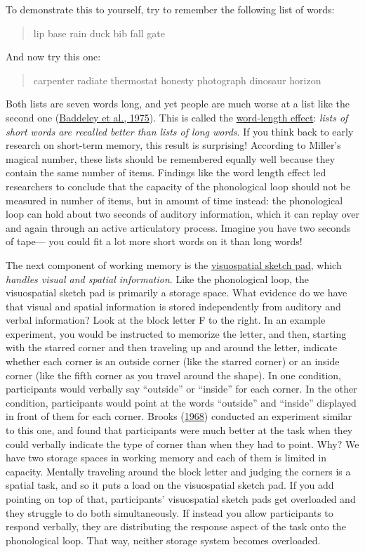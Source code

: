 \documentclass[
]{krantz}
\begin{document}
To demonstrate this to yourself, try to remember the following list of words:

\begin{quote}
lip base rain duck bib fall gate
\end{quote}

And now try this one:

\begin{quote}
carpenter radiate thermostat honesty photograph dinosaur horizon
\end{quote}

Both lists are seven words long, and yet people are much worse at a list like the second one (\protect\hyperlink{ref-baddeley1975word}{Baddeley et al., 1975}). This is called the \protect\hyperlink{word-length-effect}{word-length effect}: \emph{lists of short words are recalled better than lists of long words}. If you think back to early research on short-term memory, this result is surprising! According to Miller's magical number, these lists should be remembered equally well because they contain the same number of items. Findings like the word length effect led researchers to conclude that the capacity of the phonological loop should not be measured in number of items, but in amount of time instead: the phonological loop can hold about two seconds of auditory information, which it can replay over and again through an active articulatory process. Imagine you have two seconds of tape--- you could fit a lot more short words on it than long words!

The next component of working memory is the \protect\hyperlink{visuospatial-sketch-pad}{visuospatial sketch pad}, which \emph{handles visual and spatial information}. Like the phonological loop, the visuospatial sketch pad is primarily a storage space. What evidence do we have that visual and spatial information is stored independently from auditory and verbal information? Look at the block letter F to the right. In an example experiment, you would be instructed to memorize the letter, and then, starting with the starred corner and then traveling up and around the letter, indicate whether each corner is an outside corner (like the starred corner) or an inside corner (like the fifth corner as you travel around the shape). In one condition, participants would verbally say ``outside'' or ``inside'' for each corner. In the other condition, participants would point at the words ``outside'' and ``inside'' displayed in front of them for each corner. Brooks (\protect\hyperlink{ref-Brooks1968}{1968}) conducted an experiment similar to this one, and found that participants were much better at the task when they could verbally indicate the type of corner than when they had to point. Why? We have two storage spaces in working memory and each of them is limited in capacity. Mentally traveling around the block letter and judging the corners is a spatial task, and so it puts a load on the visuospatial sketch pad. If you add pointing on top of that, participants' visuospatial sketch pads get overloaded and they struggle to do both simultaneously. If instead you allow participants to respond verbally, they are distributing the response aspect of the task onto the phonological loop. That way, neither storage system becomes overloaded.
\end{document}
